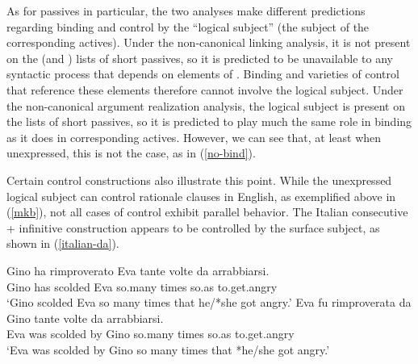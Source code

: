 \documentclass[output=paper
	        ,collection
	        ,collectionchapter
 	        ,biblatex
                ,babelshorthands
                ,newtxmath
                ,draftmode
                ,colorlinks, citecolor=brown
]{langscibook}
\begin{document}
As for passives in particular, the two analyses make different predictions regarding binding and control by the ``logical subject'' (the subject of the corresponding actives).
Under the non-canonical linking analysis, it is not present on the \argst (and \val) lists of short passives, so it is predicted to be unavailable to any syntactic process that depends on elements of \argst.
Binding and varieties of control that reference these elements therefore cannot involve the logical subject.
Under the non-canonical argument realization analysis, the logical subject is present on the \argst lists of short passives, so it is predicted to play much the same role in binding as it does in corresponding actives.
However, we can see that, at least when unexpressed, this is not the case, as in (\ref{no-bind}).
\begin{exe}
\end{exe}

Certain control constructions also illustrate this point.
While the unexpressed logical subject can control rationale clauses in English, as exemplified above in (\ref{mkb}), not all cases of control exhibit parallel behavior.
The Italian consecutive  + infinitive construction \citep{Perlmutter1984, Sanfilippo1998} appears to be controlled by the surface subject, as shown in (\ref{italian-da}).


\begin{exe}
\ex     \label{italian-da}
\begin{xlist}
\ex
\gll Gino ha  rimproverato Eva tante   volte da    arrabbiarsi.  \\
     Gino has scolded      Eva so.many times so.as to.get.angry  \\
\glt `Gino scolded Eva so many times that he/*she got angry.'
\ex
\gll Eva fu  rimproverata da Gino tante   volte da    arrabbiarsi.  \\
     Eva was scolded      by Gino so.many times so.as to.get.angry  \\
\glt `Eva was scolded by Gino so many times that *he/she got angry.'
\end{xlist}
\end{exe}
\end{document}
